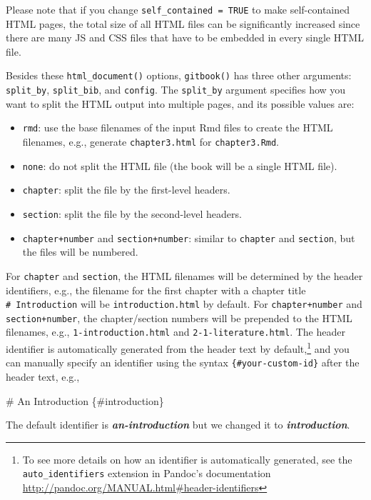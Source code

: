 \documentclass[
  12pt,
]{krantz}
\newenvironment{Shaded}{\begin{snugshade}}{\end{snugshade}}
\newcommand{\FunctionTok}[1]{\textcolor[rgb]{0.00,0.00,0.00}{#1}}
\newcommand{\InformationTok}[1]{\textcolor[rgb]{0.56,0.35,0.01}{\textbf{\textit{#1}}}}
\newcommand{\NormalTok}[1]{#1}
\providecommand{\tightlist}{%
  \setlength{\itemsep}{0pt}\setlength{\parskip}{0pt}}
\theoremstyle{definition}
\theoremstyle{definition}
\theoremstyle{definition}
\theoremstyle{definition}
\theoremstyle{remark}
\begin{document}
Please note that if you change \texttt{self\_contained\ =\ TRUE} to make self-contained HTML pages, the total size of all HTML files can be significantly increased since there are many JS and CSS files that have to be embedded in every single HTML file.

Besides these \texttt{html\_document()} options, \texttt{gitbook()} has three other arguments: \texttt{split\_by}, \texttt{split\_bib}, and \texttt{config}. The \texttt{split\_by} argument specifies how you want to split the HTML output into multiple pages, and its possible values are:

\begin{itemize}
\tightlist
\item
  \texttt{rmd}: use the base filenames of the input Rmd files to create the HTML filenames, e.g., generate \texttt{chapter3.html} for \texttt{chapter3.Rmd}.
\item
  \texttt{none}: do not split the HTML file (the book will be a single HTML file).
\item
  \texttt{chapter}: split the file by the first-level headers.
\item
  \texttt{section}: split the file by the second-level headers.
\item
  \texttt{chapter+number} and \texttt{section+number}: similar to \texttt{chapter} and \texttt{section}, but the files will be numbered.
\end{itemize}

For \texttt{chapter} and \texttt{section}, the HTML filenames will be determined by the header identifiers, e.g., the filename for the first chapter with a chapter title \texttt{\#\ Introduction} will be \texttt{introduction.html} by default. For \texttt{chapter+number} and \texttt{section+number}, the chapter/section numbers will be prepended to the HTML filenames, e.g., \texttt{1-introduction.html} and \texttt{2-1-literature.html}. The header identifier is automatically generated from the header text by default,\footnote{To see more details on how an identifier is automatically generated, see the \texttt{auto\_identifiers} extension in Pandoc's documentation \url{http://pandoc.org/MANUAL.html\#header-identifiers}} and you can manually specify an identifier using the syntax \texttt{\{\#your-custom-id\}} after the header text, e.g.,

\begin{Shaded}
\begin{Highlighting}[]
\FunctionTok{\# An Introduction \{\#introduction\}}

\NormalTok{The default identifier is }\InformationTok{\textasciigrave{}an{-}introduction\textasciigrave{}}\NormalTok{ but we changed}
\NormalTok{it to }\InformationTok{\textasciigrave{}introduction\textasciigrave{}}\NormalTok{.}
\end{Highlighting}
\end{Shaded}
\end{document}
